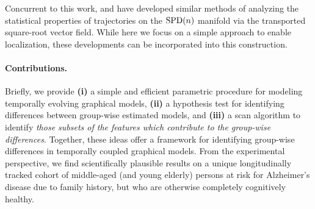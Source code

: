 

Concurrent to this work, \cite{su2014statistical} and \cite{zhang2018rate} have developed similar methods of analyzing the statistical properties of trajectories on the $\text{SPD}(n)$ manifold via the transported square-root vector field. While here we focus on a simple approach to enable localization, these developments can be incorporated into this construction.

\paragraph{Contributions.} Briefly, we provide \textbf{(i)} a simple and efficient parametric procedure for modeling temporally evolving graphical models, \textbf{(ii)} a 
hypothesis test for identifying differences between group-wise estimated models, and \textbf{(iii)} a scan
algorithm to identify {\em those subsets of the features which contribute to the group-wise differences}.
Together, these ideas offer a framework for identifying group-wise differences in temporally coupled graphical models.
From the experimental perspective, we find scientifically plausible results on 
a unique longitudinally tracked cohort of middle-aged (and young elderly) persons at risk for Alzheimer's disease due to family history, 
but who are otherwise completely cognitively healthy.

